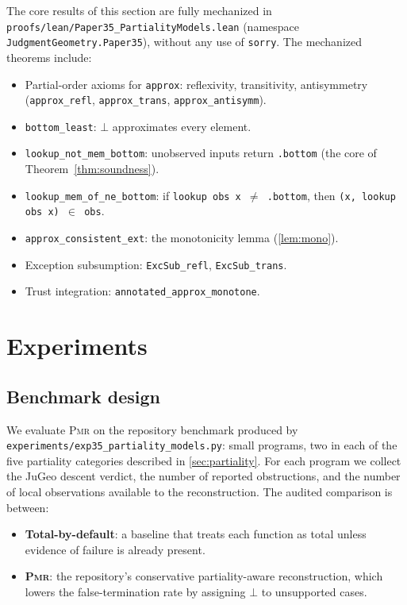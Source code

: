 \documentclass[11pt]{article}
\newcommand{\PMR}{\textsc{Pmr}}            %
\begin{document}
The core results of this section are fully mechanized in
\texttt{proofs/lean/Paper35\_PartialityModels.lean} (namespace
\texttt{JudgmentGeometry.Paper35}), without any use of \texttt{sorry}.
The mechanized theorems include:

\begin{itemize}
  \item Partial-order axioms for \texttt{approx}: reflexivity,
        transitivity, antisymmetry (\texttt{approx\_refl},
        \texttt{approx\_trans}, \texttt{approx\_antisymm}).
  \item \texttt{bottom\_least}: $\bot$ approximates every element.
  \item \texttt{lookup\_not\_mem\_bottom}: unobserved inputs return
        \texttt{.bottom} (the core of Theorem~\ref{thm:soundness}).
  \item \texttt{lookup\_mem\_of\_ne\_bottom}: if \texttt{lookup obs x
        $\neq$ .bottom}, then \texttt{(x, lookup obs x) $\in$ obs}.
  \item \texttt{approx\_consistent\_ext}: the monotonicity lemma
        (\cref{lem:mono}).
  \item Exception subsumption: \texttt{ExcSub\_refl},
        \texttt{ExcSub\_trans}.
  \item Trust integration: \texttt{annotated\_approx\_monotone}.
\end{itemize}

\section{Experiments}\label{sec:experiments}

\subsection{Benchmark design}

We evaluate \PMR{} on the repository benchmark produced by
\texttt{experiments/exp35\_partiality\_models.py}: \ppXXXVTotalPrograms{}
small programs, two in each of the five partiality categories described in
\cref{sec:partiality}.  For each program we collect the JuGeo descent verdict,
the number of reported obstructions, and the number of local observations
available to the reconstruction.  The audited comparison is between:
\begin{itemize}
  \item \textbf{Total-by-default}: a baseline that treats each function as
        total unless evidence of failure is already present.
  \item \textbf{\PMR{}}: the repository's conservative partiality-aware
        reconstruction, which lowers the false-termination rate by assigning
        $\bot$ to unsupported cases.
\end{itemize}
\end{document}
